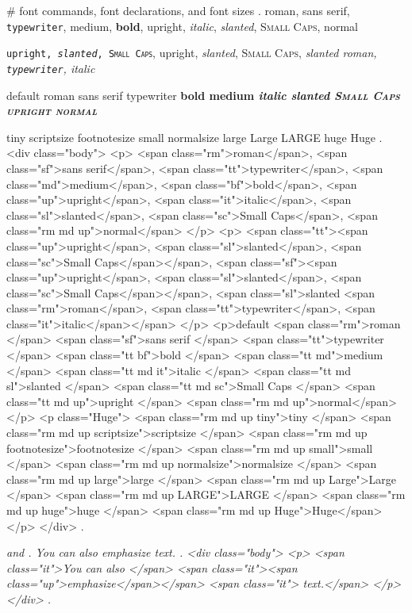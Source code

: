 #
font commands, font declarations, and font sizes
.
\textrm{roman}, \textsf{sans serif}, \texttt{typewriter}, \textmd{medium}, \textbf{bold},
\textup{upright}, \textit{italic}, \textsl{slanted}, \textsc{Small Caps}, \textnormal{normal}

\texttt{\textup{upright}, \textsl{slanted}, \textsc{Small Caps}},
\textsf{\textup{upright}, \textsl{slanted}, \textsc{Small Caps}},
\textsl{slanted \textrm{roman}, \texttt{typewriter}, \textit{italic}}

default \rmfamily roman \sffamily sans serif \ttfamily typewriter
\bfseries bold \mdseries medium
\itshape italic \slshape slanted \scshape Small Caps \upshape upright
\normalfont normal

\tiny tiny \scriptsize scriptsize \footnotesize footnotesize \small small \normalsize normalsize
\large large \Large Large \LARGE LARGE \huge huge \Huge Huge
.
<div class="body">
<p>
<span class="rm">roman</span>,
 <span class="sf">sans serif</span>,
 <span class="tt">typewriter</span>,
 <span class="md">medium</span>,
 <span class="bf">bold</span>,
 <span class="up">upright</span>,
 <span class="it">italic</span>,
 <span class="sl">slanted</span>,
 <span class="sc">Small Caps</span>,
 <span class="rm md up">normal</span>
</p>
<p>
<span class="tt"><span class="up">upright</span>, <span class="sl">slanted</span>, <span class="sc">Small Caps</span></span>,
 <span class="sf"><span class="up">upright</span>, <span class="sl">slanted</span>, <span class="sc">Small Caps</span></span>,
 <span class="sl">slanted <span class="rm">roman</span>, <span class="tt">typewriter</span>, <span class="it">italic</span></span>
</p>
<p>default <span class="rm">roman </span>
<span class="sf">sans serif </span>
<span class="tt">typewriter </span>
<span class="tt bf">bold </span>
<span class="tt md">medium </span>
<span class="tt md it">italic </span>
<span class="tt md sl">slanted </span>
<span class="tt md sc">Small Caps </span>
<span class="tt md up">upright </span>
<span class="rm md up">normal</span>
</p>
<p class="Huge">
<span class="rm md up tiny">tiny </span>
<span class="rm md up scriptsize">scriptsize </span>
<span class="rm md up footnotesize">footnotesize </span>
<span class="rm md up small">small </span>
<span class="rm md up normalsize">normalsize </span>
<span class="rm md up large">large </span>
<span class="rm md up Large">Large </span>
<span class="rm md up LARGE">LARGE </span>
<span class="rm md up huge">huge </span>
<span class="rm md up Huge">Huge</span>
</p>
</div>
.


\em and \emph{}
.
\em You can also \emph{emphasize} text.
.
<div class="body">
<p>
<span class="it">You can also </span>
<span class="it"><span class="up">emphasize</span></span>
<span class="it"> text.</span>
</p>
</div>
.


